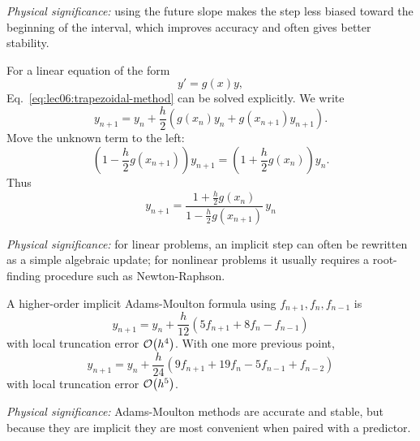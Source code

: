 \textit{Physical significance:} using the future slope makes the step less
biased toward the beginning of the interval, which improves accuracy and
often gives better stability.

For a linear equation of the form
\begin{equation}
    y'=g(x)y,
    \label{eq:lec06:linear-ode-g}
\end{equation}
Eq.~\eqref{eq:lec06:trapezoidal-method} can be solved explicitly. We write
\begin{equation}
    y_{n+1}
    =y_n+\frac{h}{2}\left(g(x_n)y_n+g(x_{n+1})y_{n+1}\right).
    \label{eq:lec06:trapezoidal-linear-start}
\end{equation}
Move the unknown term to the left:
\begin{equation}
    \left(1-\frac{h}{2}g(x_{n+1})\right)y_{n+1}
    =\left(1+\frac{h}{2}g(x_n)\right)y_n.
    \label{eq:lec06:trapezoidal-linear-solve}
\end{equation}
Thus
\begin{equation}
    \boxed{
    y_{n+1}
    =
    \frac{1+\frac{h}{2}g(x_n)}
         {1-\frac{h}{2}g(x_{n+1})}\,y_n}
    \label{eq:lec06:trapezoidal-linear-result}
\end{equation}

\textit{Physical significance:} for linear problems, an implicit step can
often be rewritten as a simple algebraic update; for nonlinear problems it
usually requires a root-finding procedure such as Newton-Raphson.

A higher-order implicit Adams-Moulton formula using
$f_{n+1},f_n,f_{n-1}$ is
\begin{equation}
    \boxed{
    y_{n+1}
    =y_n+\frac{h}{12}\left(5f_{n+1}+8f_n-f_{n-1}\right)}
    \label{eq:lec06:am3}
\end{equation}
with local truncation error $\mathcal{O}\!\left(h^4\right)$. With one more previous point,
\begin{equation}
    \boxed{
    y_{n+1}
    =y_n+\frac{h}{24}\left(9f_{n+1}+19f_n-5f_{n-1}+f_{n-2}\right)}
    \label{eq:lec06:am4}
\end{equation}
with local truncation error $\mathcal{O}\!\left(h^5\right)$.

\textit{Physical significance:} Adams-Moulton methods are accurate and
stable, but because they are implicit they are most convenient when paired
with a predictor.

